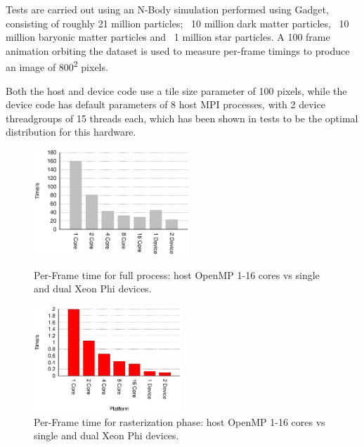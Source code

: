 \documentclass[runningheads,a4paper]{llncs}
\begin{document}
Tests are carried out using an N-Body simulation performed using Gadget, consisting of roughly 21 million 
particles;  ~10 million dark matter particles, ~10 million baryonic matter particles and ~1 million star particles. 
A 100 frame animation orbiting the dataset is used to measure per-frame timings to produce an image of 800\textsuperscript{2} pixels.

Both the host and device code use a tile size parameter of 100 pixels, while the device code has default parameters of 
8 host MPI processes, with 2 device threadgroups of 15 threads each, which has been shown in tests to be the optimal 
distribution for this hardware.


\begin{figure}
\centering
\begin{minipage}[t]{.45\textwidth}
  \centering
  \includegraphics[height=4.0cm]{TotalTime}
  \caption{Per-Frame time for full process: host OpenMP 1-16 cores vs single and dual Xeon Phi devices.}
  \label{fig:totaltimes}
\end{minipage}
\begin{minipage}[t]{.45\textwidth}
  \centering
  \includegraphics[height=4.0cm]{Rotocol}
  \caption{Per-Frame time for rasterization phase: host OpenMP 1-16 cores vs single and dual Xeon Phi devices.}
  \label{fig:rotocol}
\end{minipage}
\end{figure}
\end{document}
